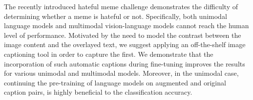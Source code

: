 The recently introduced hateful meme challenge demonstrates the difficulty of determining whether a meme is hateful or not. Specifically, both unimodal language models and multimodal vision-language models cannot reach the human level of performance. Motivated by the need to model the contrast between the image content and the overlayed text, we suggest applying an off-the-shelf image captioning tool in order to capture the first. We demonstrate that the incorporation of such automatic captions during fine-tuning improves the results for various unimodal and multimodal models. Moreover, in the unimodal case, continuing the pre-training of language models on augmented and original caption pairs, is highly beneficial to the classification accuracy.
